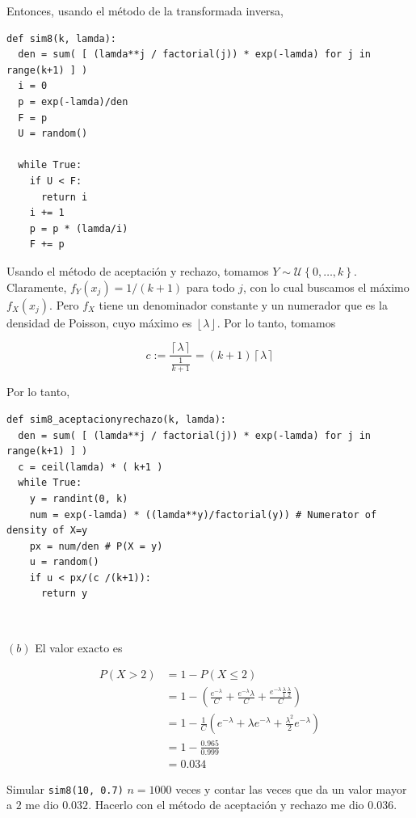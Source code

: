 \documentclass[a4paper, 12pt]{article}
\begin{document}
Entonces, usando el método de la transformada inversa,

\footnotesize
\begin{verbatim}
def sim8(k, lamda):
  den = sum( [ (lamda**j / factorial(j)) * exp(-lamda) for j in range(k+1) ] )
  i = 0 
  p = exp(-lamda)/den
  F = p 
  U = random()

  while True:
    if U < F:
      return i 
    i += 1 
    p = p * (lamda/i) 
    F += p
\end{verbatim}
\normalsize

Usando el método de aceptación y rechazo, tomamos $Y \sim \mathcal{U}\left\{
0,\ldots, k \right\} $. Claramente, $f_Y(x_j) = 1 / (k+1)$ para todo $j$, con lo
cual buscamos el máximo $f_X(x_j)$. Pero $f_X$ tiene un denominador constante y
un numerador que es la densidad de Poisson, cuyo máximo es $\left\lfloor \lambda
\right\rfloor$. Por lo tanto, tomamos 

\begin{equation*}
  c := \frac{\left\lceil \lambda \right\rceil}{\frac{1}{k+1}} =
  (k+1)\left\lceil \lambda \right\rceil
\end{equation*}

Por lo tanto,

\footnotesize
\begin{verbatim}
def sim8_aceptacionyrechazo(k, lamda):
  den = sum( [ (lamda**j / factorial(j)) * exp(-lamda) for j in range(k+1) ] )
  c = ceil(lamda) * ( k+1 )
  while True:
    y = randint(0, k) 
    num = exp(-lamda) * ((lamda**y)/factorial(y)) # Numerator of density of X=y
    px = num/den # P(X = y)
    u = random()
    if u < px/(c /(k+1)):
      return y 
\end{verbatim}
\normalsize
~

$(b)$ El valor exacto es 

\begin{align*}
  P(X > 2) 
  &= 1 - P(X \leq 2) \\ 
  &=1 - \left( \frac{e^{-\lambda}}{C} + \frac{e^{-\lambda}\lambda}{C} +
  \frac{e^{-\lambda}\frac{\lambda}{1}\frac{\lambda}{2}}{C}\right)
  \\ 
  &=1 - \frac{1}{C}(e^{-\lambda} + \lambda e^{-\lambda} +
  \frac{\lambda^2}{2}e^{-\lambda}) \\ 
  &= 1 - \frac{0.965}{0.999} \\ 
  &= 0.034
\end{align*}

Simular \texttt{sim8(10, 0.7)} $n = 1000$ veces y contar las veces que da un
valor mayor a $2$ me dio $0.032$. Hacerlo con el método de aceptación y rechazo
me dio 0.036.
\end{document}
